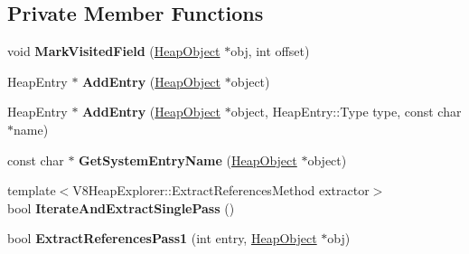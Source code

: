 \subsection*{Private Member Functions}
\begin{DoxyCompactItemize}
\item 
void {\bfseries Mark\+Visited\+Field} (\hyperlink{classv8_1_1internal_1_1_heap_object}{Heap\+Object} $\ast$obj, int offset)\hypertarget{classv8_1_1internal_1_1_v8_heap_explorer_ab8e3a11e9c73c58bb31bff696dc753c5}{}\label{classv8_1_1internal_1_1_v8_heap_explorer_ab8e3a11e9c73c58bb31bff696dc753c5}

\item 
Heap\+Entry $\ast$ {\bfseries Add\+Entry} (\hyperlink{classv8_1_1internal_1_1_heap_object}{Heap\+Object} $\ast$object)\hypertarget{classv8_1_1internal_1_1_v8_heap_explorer_ae13d69b500427cc92e7089c5edac762a}{}\label{classv8_1_1internal_1_1_v8_heap_explorer_ae13d69b500427cc92e7089c5edac762a}

\item 
Heap\+Entry $\ast$ {\bfseries Add\+Entry} (\hyperlink{classv8_1_1internal_1_1_heap_object}{Heap\+Object} $\ast$object, Heap\+Entry\+::\+Type type, const char $\ast$name)\hypertarget{classv8_1_1internal_1_1_v8_heap_explorer_a308bd2bfe30c41196939b49a57b66a48}{}\label{classv8_1_1internal_1_1_v8_heap_explorer_a308bd2bfe30c41196939b49a57b66a48}

\item 
const char $\ast$ {\bfseries Get\+System\+Entry\+Name} (\hyperlink{classv8_1_1internal_1_1_heap_object}{Heap\+Object} $\ast$object)\hypertarget{classv8_1_1internal_1_1_v8_heap_explorer_a8c803b0d642a6c76cdb917788826ddb9}{}\label{classv8_1_1internal_1_1_v8_heap_explorer_a8c803b0d642a6c76cdb917788826ddb9}

\item 
{\footnotesize template$<$V8\+Heap\+Explorer\+::\+Extract\+References\+Method extractor$>$ }\\bool {\bfseries Iterate\+And\+Extract\+Single\+Pass} ()\hypertarget{classv8_1_1internal_1_1_v8_heap_explorer_a62bb0a35c7dd67093bbb56404b95189f}{}\label{classv8_1_1internal_1_1_v8_heap_explorer_a62bb0a35c7dd67093bbb56404b95189f}

\item 
bool {\bfseries Extract\+References\+Pass1} (int entry, \hyperlink{classv8_1_1internal_1_1_heap_object}{Heap\+Object} $\ast$obj)\hypertarget{classv8_1_1internal_1_1_v8_heap_explorer_a6cc2e7618767b9dfd37ebf023040d3bd}{}\label{classv8_1_1internal_1_1_v8_heap_explorer_a6cc2e7618767b9dfd37ebf023040d3bd}


\end{DoxyCompactItemize}
